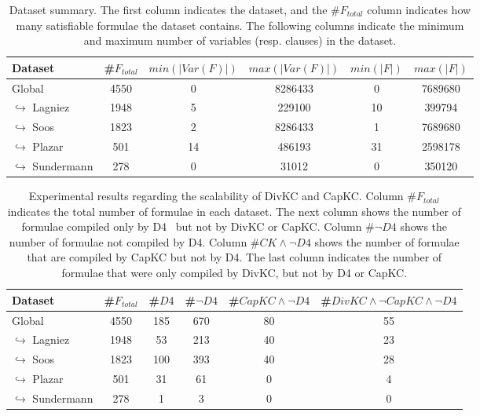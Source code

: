 \documentclass{article}
\newcommand\dfour[0]{D4\xspace}
\newcommand\divkc[0]{DivKC\xspace}
\newcommand\capkc[0]{CapKC\xspace}
\newcommand\var{\textit{Var}}
\begin{document}
    
\begin{table}[h!]
        \centering
            \begin{tabular}{l|c|c|c|c|c}
                Dataset & \#$F_\textit{total}$ & $\textit{min}(|\var(F)|)$ & $\textit{max}(|\var(F)|)$ & $\textit{min}(|F|)$ & $\textit{max}(|F|)$ \\
                \hline
    
Global & 4550 & 0 & 8286433 & 0 & 7689680 \\
$\hookrightarrow$ Lagniez \cite{D4} & 1948 & 5 & 229100 & 10 & 399794 \\
$\hookrightarrow$ Soos \cite{soos_2024_10449477} & 1823 & 2 & 8286433 & 1 & 7689680 \\
$\hookrightarrow$ Plazar \cite{Plazar2019} & 501 & 14 & 486193 & 31 & 2598178 \\
$\hookrightarrow$ Sundermann \cite{SBK+:SPLC24} & 278 & 0 & 31012 & 0 & 350120 \\
            \end{tabular}
                \caption{Dataset summary.
            The first column indicates the dataset, and the \#$F_\textit{total}$ column indicates how many satisfiable formulae the dataset contains.
            The following columns indicate the minimum and maximum number of variables (resp. clauses) in the dataset.}
        \label{results:tab:datasets}
    \end{table}

    
\begin{table}[h!]
        \centering
        \begin{tabular}{l|c|c|c|c|c}
            Dataset & \#$F_\textit{total}$ & \#$\textit{\dfour}$ & \#$\neg \textit{\dfour}$ & \#$\textit{\capkc} \land \neg \textit{\dfour}$ & \#$\textit{\divkc} \land \neg \textit{\capkc} \land \neg \textit{\dfour}$ \\ 
            \hline
Global & 4550 & 185 & 670 & 80 & 55 \\
$\hookrightarrow$ Lagniez \cite{D4} & 1948 & 53 & 213 & 40 & 23 \\
$\hookrightarrow$ Soos \cite{soos_2024_10449477} & 1823 & 100 & 393 & 40 & 28 \\
$\hookrightarrow$ Plazar \cite{Plazar2019} & 501 & 31 & 61 & 0 & 4 \\
$\hookrightarrow$ Sundermann \cite{SBK+:SPLC24} & 278 & 1 & 3 & 0 & 0 \\
    \end{tabular}
            \caption{Experimental results regarding the scalability of \divkc and \capkc.
            Column \#$F_\textit{total}$ indicates the total number of formulae in each dataset.
            The next column shows the number of formulae compiled only by \dfour~\cite{D4} but not by \divkc or \capkc.
            Column \#$\neg\textit{\dfour}$ shows the number of formulae not compiled by \dfour.
            Column \#$\textit{CK} \land \neg \textit{\dfour}$ shows the number of formulae that are compiled by \capkc but not by \dfour.
            The last column indicates the number of formulae that were only compiled by \divkc, but not by \dfour or \capkc.
        }
        \label{divkc:tab:gen}
    \end{table}
\end{document}
